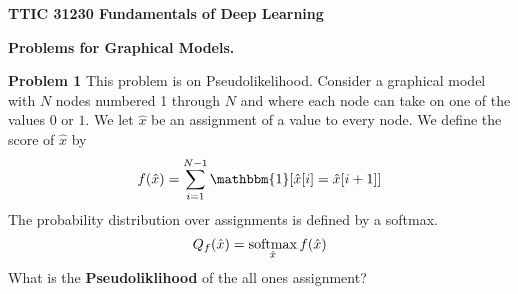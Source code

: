 \documentclass{article}
\newcommand{\solution}[1]{}
\begin{document}
\centerline{\bf TTIC 31230 Fundamentals of Deep Learning}

\bigskip

\centerline{\bf Problems for Graphical Models.}

\bigskip
\bigskip

{\bf Problem 1}
This problem is on Pseudolikelihood. Consider a graphical model with $N$ nodes numbered 1 through $N$ and where each node can take on one of the values $0$ or $1$.
We let $\hat{x}$ be an assignment of a value to every node. We define the score of $\hat{x}$ by
$$f(\hat{x}) = \sum_{i = 1}^{N-1} \mathbbm{1}[\hat{x}[i] = \hat{x}[i+1]]$$
The probability distribution over assignments is defined by a softmax.
$$Q_f(\hat{x}) = \operatorname*{softmax}_{\hat{x}} f(\hat{x})$$
What is the {\bf Pseudoliklihood} of the all ones assignment?

\solution{
$$\tilde{P}_f(\hat{x}) = \Pi_i P_f(\hat{x}[i] \;|\; \hat{x}/i)$$

where $\hat{x}/i$ consists of all components of $\hat{x}$ other than $i$.  In a graphical model $P_f(\hat{x}[i] \;|\; \hat{x}/i)$ is determined by the neighbors of $i$ and we can consider only how a value is scored against it neighbors.  For $\hat{x}$ equal to all ones we have

\begin{eqnarray*}
f(\hat{x}) & = & N-1 \\
\\
f(\hat{x}[i = 0]) & = & \left\{\begin{array}{ll} N-3 & \mbox{for $1 < i < N$} \\ N-2 & \mbox{for $i=1$ or $i=N$} \end{array}\right.
\end{eqnarray*}
For $1 < i < N$ we get
\begin{eqnarray*}
Q_f(\hat{x}[i=1]\; |\;\hat{x}/i) & = & \frac{e^{N-1}}{e^{N-1} + e^{N-3}} \\
\\
& = & \frac{1}{1 + e^{-2}}
\end{eqnarray*}
and for $i = 1$ or $i = N$ we get
$$Q_f(\hat{x}[i=1]\; |\;\hat{x}/i) = \frac{1}{1 + e^{-1}}$$

This gives

$$\tilde{Q}(\hat{x}) = (1 + e^{-1})^{-2}(1 + e^{-2})^{-(N-2)}$$
}



  
\end{document}
